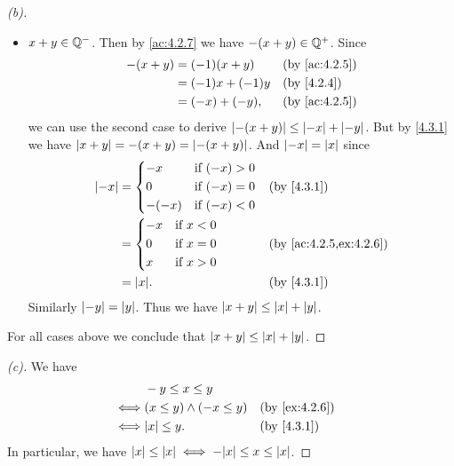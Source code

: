 \begin{proof}[(b)]
\begin{itemize}
\begin{itemize}
          \end{itemize}
    \item \(x + y \in \mathbb{Q}^-\).
          Then by \cref{ac:4.2.7} we have \(-(x + y) \in \mathbb{Q}^+\).
          Since
          \begin{align*}
            -(x + y) & = (-1) (x + y)    &  & \by{ac:4.2.5} \\
                     & = (-1) x + (-1) y &  & \by{4.2.4}    \\
                     & = (-x) + (-y),    &  & \by{ac:4.2.5}
          \end{align*}
          we can use the second case to derive \(\left\lvert-(x + y)\right\rvert \leq \left\lvert-x\right\rvert + \left\lvert-y\right\rvert\).
          But by \cref{4.3.1} we have \(\left\lvert x + y\right\rvert = -(x + y) = \left\lvert-(x + y)\right\rvert\).
          And \(\left\lvert-x\right\rvert = \left\lvert x\right\rvert\) since
          \begin{align*}
            \abs{-x} & = \begin{dcases}
                           -x    & \text{if } (-x) > 0 \\
                           0     & \text{if } (-x) = 0 \\
                           -(-x) & \text{if } (-x) < 0
                         \end{dcases} &  & \by{4.3.1}                   \\
                     & = \begin{dcases}
                           -x & \text{if } x < 0 \\
                           0  & \text{if } x = 0 \\
                           x  & \text{if } x > 0
                         \end{dcases}       &  & \by{ac:4.2.5,ex:4.2.6} \\
                     & = \abs{x}.                     &  & \by{4.3.1}
          \end{align*}
          Similarly \(\left\lvert-y\right\rvert = \left\lvert y\right\rvert\).
          Thus we have \(\left\lvert x + y\right\rvert \leq \left\lvert x\right\rvert + \left\lvert y\right\rvert\).
  \end{itemize}
  For all cases above we conclude that \(\left\lvert x + y\right\rvert \leq \left\lvert x\right\rvert + \left\lvert y\right\rvert\).
\end{proof}

\begin{proof}[(c)]
  We have
  \begin{align*}
         & -y \leq x \leq y                                \\
    \iff & (x \leq y) \land (-x \leq y) &  & \by{ex:4.2.6} \\
    \iff & \abs{x} \leq y.              &  & \by{4.3.1}
  \end{align*}
  In particular, we have \(\abs{x} \leq \abs{x} \iff -\abs{x} \leq x \leq \abs{x}\).
\end{proof}

